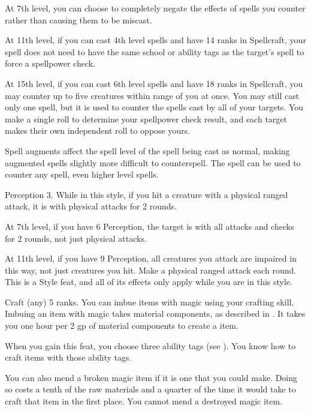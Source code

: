     At 7th level, you can choose to completely negate the effects of spells you counter rather than causing them to be miscast.

    At 11th level, if you can cast 4th level spells and have 14 ranks in Spellcraft, your spell does not need to have the same school or ability tags as the target's spell to force a spellpower check.

    At 15th level, if you can cast 6th level spells and have 18 ranks in Spellcraft, you may counter up to five creatures within \rngmed range of you at once.
    You may still cast only one spell, but it is used to counter the spells cast by all of your targets.
    You make a single roll to determine your spellpower check result, and each target makes their own independent roll to oppose yours.

    Spell augments affect the spell level of the spell being cast as normal, making augmented spells slightly more difficult to counterspell.
    The  spell can be used to counter any spell, even higher level spells.

    \featpres Perception 3.
    \featben While in this style, if you hit a creature with a physical ranged attack, it is \impaired with physical attacks for 2 rounds.

    At 7th level, if you have 6 Perception, the target is \impaired with all attacks and checks for 2 rounds, not just physical attacks.

    At 11th level, if you have 9 Perception, all creatures you attack are impaired in this way, not just creatures you hit.
    \stylereq Make a physical ranged attack each round.
     This is a Style feat, and all of its effects only apply while you are in this style.

    \featpre Craft (any) 5 ranks.
    \featben You can imbue items with magic using your crafting skill.
    Imbuing an item with magic takes material components, as described in .
    It takes you one hour per 2 gp of material components to create a item.

    When you gain this feat, you choose three ability tags (see ).
    You know how to craft items with those ability tags.

    You can also mend a broken magic item if it is one that you could make.
    Doing so costs a tenth of the raw materials and a quarter of the time it would take to craft that item in the first place.
    You cannot mend a destroyed magic item.

